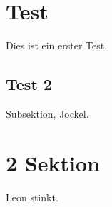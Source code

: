 \section{Test}
Dies ist ein erster Test.

\subsection{Test 2}
Subsektion, Jockel.

\section{2 Sektion}
Leon stinkt.